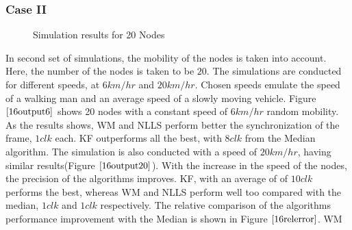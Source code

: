 \documentclass[journal]{IEEEtran}
\begin{document}
\subsubsection{\textbf{Case II}}
\begin{figure}
\centerline{
 \hfil {}} \caption{Simulation results for 20 Nodes}
\label{16output}
\end{figure}
In second set of simulations, the mobility of the nodes is taken
into account. Here, the number of the nodes is taken to be $20$. The
simulations are conducted for different speeds, at $6km/hr$ and
$20km/hr$. Chosen speeds emulate the speed of a walking man and an
average speed of a slowly moving vehicle. \newline Figure
$\ref{16output6}$ shows 20 nodes with a constant speed of $6km/hr$
random mobility. As the results shows, WM and NLLS perform better
the synchronization of the frame, $1 clk$ each. KF outperforms all
the best, with $8 clk$ from the Median algorithm. \newline The
simulation is also conducted with a speed of $20km/hr$, having
similar results(Figure $\ref{16output20}$). With the increase in the
speed of the nodes, the precision of the algorithms improves. KF,
with an average of of $10 clk$ performs the best, whereas WM and
NLLS perform well too compared with the median, $1 clk$ and $1 clk$
respectively. \newline
The relative comparison of the algorithms performance improvement with the Median is shown in Figure $\ref{16relerror}$. WM
\end{document}
